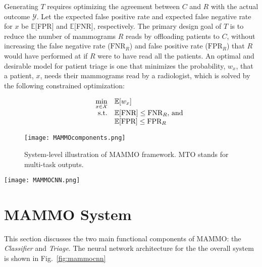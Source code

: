 \documentclass[journal]{IEEEtran}
\begin{document}
Generating $T$ requires optimizing the agreement between $C$ and $R$ with the actual outcome $\mathcal{Y}$. 
Let the expected false positive rate and expected false negative rate for $x$ be $\mathbb{E}[$FPR$]$ and $\mathbb{E}[$FNR$]$, respectively.  The primary design goal of $T$ is to reduce the number of mammograms $R$ reads by offloading patients to $C$, without increasing the false negative rate ($\text{FNR}_{R}$) and false positive rate  ($\text{FPR}_{R}$) that $R$ would have performed at if $R$ were to have read all the patients. An optimal and desirable model for patient triage is one that minimizes the probability, $w_x$, that a patient, $x$, needs their mammograms read by a radiologist, which is solved by the following constrained optimization:

\begin{equation} \label{eq:maximize}
   \begin{array}{rrclcl}
    \displaystyle \min_{x \in \mathcal{X}} & \multicolumn{3}{l}{\mathbb{E}[w_x]} \\
    \textrm{s.t.} & \text{$\mathbb{E}[$FNR$]$} \leq \text{FNR}_{R} \text{, and}\\
     & \multicolumn{3}{l}{\text{$\mathbb{E}[$FPR$]$} \leq \text{FPR}_{R}} \\
\end{array}
\end{equation}  


\begin{figure}[t!]
\centering
    \texttt{[image: MAMMOcomponents.png]}
    \caption{\label{fig:mammocomponents} System-level illustration of MAMMO framework. MTO stands for multi-task outputs.}
\end{figure}

\begin{figure*}[!t]
  \texttt{[image: MAMMOCNN.png]}
  \caption{Full MAMMO network as a stacked classifier of 4 MAMMO CNNs. Highlighted are the multi-task outputs of each view and how they are fused to generate the \textit{Classifier} and \textit{Triage} networks.}
  \label{fig:mammocnn}
\end{figure*}


\section{MAMMO System}

This section discusses the two main functional components of MAMMO: the \textit{Classifier} and \textit{Triage}.  The neural network architecture for the the overall system is shown in Fig.~\ref{fig:mammocnn} 
\end{document}
